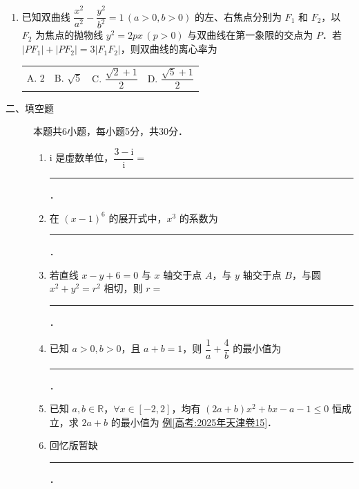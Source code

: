 \begin{description}
\begin{enumerate}[leftmargin=5pt]
        \item 已知双曲线 $\dfrac{x^2}{a^2}-\dfrac{y^2}{b^2}=1\,(a>0,b>0)$ 的左、右焦点分别为 $F_1$ 和 $F_2$，以 $F_2$ 为焦点的抛物线 $y^2=2px\,(p>0)$ 与双曲线在第一象限的交点为 $P$．若 $|PF_1|+|PF_2|=3|F_1F_2|$，则双曲线的离心率为
     
        {\centering\begin{tabular*}{\linewidth}{@{}@{\extracolsep{\fill}}llll@{}}
          \(\text{A. }2\) & \(\text{B. }\sqrt{5}\) & \(\text{C. }\dfrac{\sqrt{2}+1}{2}\) & \(\text{D. }\dfrac{\sqrt{5}+1}{2}\)
        \end{tabular*}\par}
    \end{enumerate}
\end{description}

\begin{description}
    \item[二、填空题] 本题共6小题，每小题5分，共30分．
    \begin{enumerate}[leftmargin=5pt]
      \addtocounter{enumi}{+9}
        \item $\mathrm{i}$ 是虚数单位，$\dfrac{3-\mathrm{i}}{\mathrm{i}}=$ \rule[-0.3ex]{3em}{0.4pt}．
        \item 在 $(x-1)^6$ 的展开式中，$x^3$ 的系数为 \rule[-0.3ex]{3em}{0.4pt}．
        \item 若直线 $x-y+6=0$ 与 $x$ 轴交于点 $A$，与 $y$ 轴交于点 $B$，与圆 $x^2+y^2=r^2$ 相切，则 $r=$ \rule[-0.3ex]{3em}{0.4pt}．
        \item 已知 $a>0,b>0$，且 $a+b=1$，则 $\dfrac{1}{a}+\dfrac{4}{b}$ 的最小值为 \rule[-0.3ex]{3em}{0.4pt}．
        \item 已知 $a,b\in\mathbb{R}$，$\forall x\in[-2,2]$，均有 $(2a+b)x^2+bx-a-1\leqslant0$ 恒成立，求 $2a+b$ 的最小值为 \uline{例\ref{高考:2025年天津卷15}}．
        \item 回忆版暂缺 \rule[-0.3ex]{3em}{0.4pt}．
    \end{enumerate}
\end{description}

